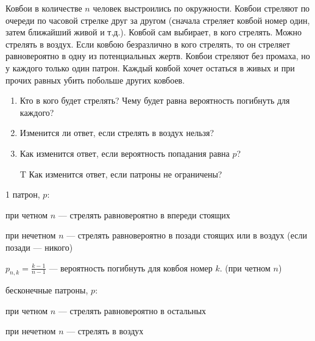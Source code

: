 \begin{problem}[Ковбои]
Ковбои в количестве $n$ человек выстроились по окружности. Ковбои стреляют по очереди по часовой стрелке друг за другом (сначала стреляет ковбой номер один, затем ближайший живой и т.д.). Ковбой сам выбирает, в кого стрелять. Можно стрелять в воздух. Если ковбою безразлично в кого стрелять, то он стреляет равновероятно в одну из потенциальных жертв. Ковбои стреляют без промаха, но у каждого только один патрон. Каждый ковбой хочет остаться в живых и при прочих равных убить побольше других ковбоев.\par
\begin{enumerate}
\item  Кто в кого будет стрелять? Чему будет равна вероятность погибнуть для каждого? \par
\item Изменится ли ответ, если стрелять в воздух нельзя? \par
\item  Как изменится ответ, если вероятность попадания равна $p$? \par
\item[T] Как изменится ответ, если патроны не ограничены?
\end{enumerate}


\begin{sol}
1 патрон, $p$: \par
при четном $n$ --- стрелять равновероятно в впереди стоящих \par
при нечетном $n$ --- стрелять равновероятно в позади стоящих или в воздух (если позади --- никого) \par
$p_{n,k}=\frac{k-1}{n-1}$ --- вероятность погибнуть для ковбоя номер $k$. (при четном $n$) \par
бесконечные патроны, $p$: \par
при четном $n$ --- стрелять равновероятно в остальных \par
при нечетном $n$ --- стрелять в воздух
\end{sol}
\end{problem}



